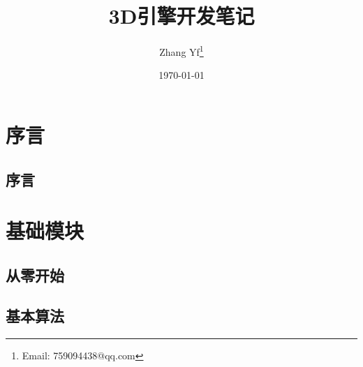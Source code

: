 \documentclass[
    UTF8,       %
    b5paper,    %
    10pt,       %
    oneside,    %
    openany,    %
    final]      %
    {ctexbook}
\title{3D引擎开发笔记}
\author{Zhang Yf\thanks{Email: 759094438@qq.com}}
\date{\today}
\begin{document}
    \maketitle
    \tableofcontents

    \frontmatter
    \maketitle
    \part{序言}

    \maketitle
    \chapter{序言}
    

    \mainmatter

    \maketitle
    \part{基础模块}

    \maketitle
    \chapter{从零开始}
    
    
    
    
    

    \maketitle
    \chapter{基本算法}

    
\end{document}
